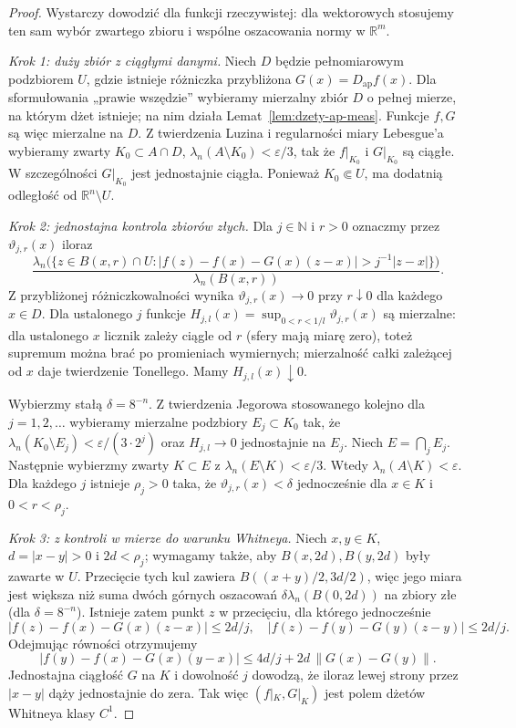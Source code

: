 \begin{proof}
Wystarczy dowodzić dla funkcji rzeczywistej: dla wektorowych
stosujemy ten sam wybór zwartego zbioru i wspólne
oszacowania normy w $\mathbb R^m$.

\emph{Krok 1: duży zbiór z ciągłymi danymi.}
Niech $D$ będzie pełnomiarowym podzbiorem $U$, gdzie
istnieje różniczka przybliżona $G(x)=D_{\mathrm{ap}}f(x)$.
Dla sformułowania „prawie wszędzie” wybieramy mierzalny
zbiór $D$ o pełnej mierze, na którym dżet istnieje;
na nim działa Lemat~\ref{lem:dzety-ap-meas}.
Funkcje $f,G$ są więc mierzalne na $D$. Z twierdzenia Luzina i regularności
miary Lebesgue'a wybieramy zwarty $K_0\subset A\cap D$,
$\lambda_n(A\setminus K_0)<\varepsilon/3$, tak że
$f|_{K_0}$ i $G|_{K_0}$ są ciągłe.
W szczególności $G|_{K_0}$ jest jednostajnie ciągła.
Ponieważ $K_0\Subset U$, ma dodatnią odległość od
$\mathbb R^n\setminus U$.

\emph{Krok 2: jednostajna kontrola zbiorów złych.}
Dla $j\in\mathbb N$ i $r>0$ oznaczmy przez
$\vartheta_{j,r}(x)$ iloraz
\[
 \frac{\lambda_n\bigl(\{z\in B(x,r)\cap U:
 |f(z)-f(x)-G(x)(z-x)|>j^{-1}|z-x|\}\bigr)}
 {\lambda_n(B(x,r))}.
\]
Z przybliżonej różniczkowalności wynika
$\vartheta_{j,r}(x)\to0$ przy $r\downarrow0$ dla
każdego $x\in D$. Dla ustalonego $j$ funkcje
$H_{j,l}(x)=\sup_{0<r<1/l}\vartheta_{j,r}(x)$ są
mierzalne: dla ustalonego $x$ licznik zależy ciągle
od $r$ (sfery mają miarę zero), toteż supremum można
brać po promieniach wymiernych; mierzalność całki
zależącej od $x$ daje twierdzenie Tonellego.
Mamy $H_{j,l}(x)\downarrow0$.

Wybierzmy stałą $\delta=8^{-n}$. Z twierdzenia Jegorowa
stosowanego kolejno dla $j=1,2,\ldots$ wybieramy
mierzalne podzbiory $E_j\subset K_0$ tak, że
$\lambda_n(K_0\setminus E_j)<\varepsilon/(3\cdot 2^j)$
oraz $H_{j,l}\to0$ jednostajnie na $E_j$.
Niech $E=\bigcap_j E_j$. Następnie wybierzmy zwarty
$K\subset E$ z $\lambda_n(E\setminus K)<\varepsilon/3$.
Wtedy $\lambda_n(A\setminus K)<\varepsilon$.
Dla każdego $j$ istnieje $\rho_j>0$ taka, że
$\vartheta_{j,r}(x)<\delta$ jednocześnie dla
$x\in K$ i $0<r<\rho_j$.

\emph{Krok 3: z kontroli w mierze do warunku Whitneya.}
Niech $x,y\in K$, $d=|x-y|>0$ i
$2d<\rho_j$; wymagamy także, aby $B(x,2d),B(y,2d)$
były zawarte w $U$. Przecięcie tych kul zawiera
$B((x+y)/2,3d/2)$, więc jego miara jest większa
niż suma dwóch górnych oszacowań
$\delta\lambda_n(B(0,2d))$ na zbiory złe
(dla $\delta=8^{-n}$). Istnieje zatem punkt $z$
w przecięciu, dla którego jednocześnie
\[
 |f(z)-f(x)-G(x)(z-x)|\le 2d/j,
 \quad |f(z)-f(y)-G(y)(z-y)|\le 2d/j.
\]
Odejmując równości otrzymujemy
\[
 |f(y)-f(x)-G(x)(y-x)|
 \le4d/j+2d\,\|G(x)-G(y)\|.
\]
Jednostajna ciągłość $G$ na $K$ i dowolność $j$
dowodzą, że iloraz lewej strony przez $|x-y|$
dąży jednostajnie do zera. Tak więc $(f|_K,G|_K)$
jest polem dżetów Whitneya klasy $C^1$.


\end{proof}
